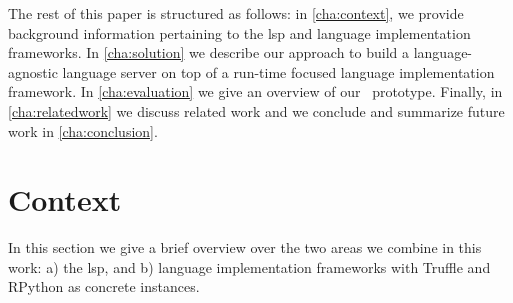 \documentclass[sigplan,10pt,review,anonymous]{acmart}
\begin{document}





The rest of this paper is structured as follows: in \autoref{cha:context}, we
provide background information pertaining to the \ac{lsp} and language
implementation frameworks. In \autoref{cha:solution} we describe our approach to
build a language-agnostic language server on top of a run-time focused language
implementation framework. In \autoref{cha:evaluation} we give an overview of our
\graallsp~prototype. Finally, in \autoref{cha:relatedwork} we discuss related
work and we conclude and summarize future work in \autoref{cha:conclusion}.

\section{Context}
\label{cha:context}

In this section we give a brief overview over the two areas we combine in this
work: a) the \acf{lsp}, and b) language implementation frameworks with Truffle
and RPython as concrete instances.
\end{document}
